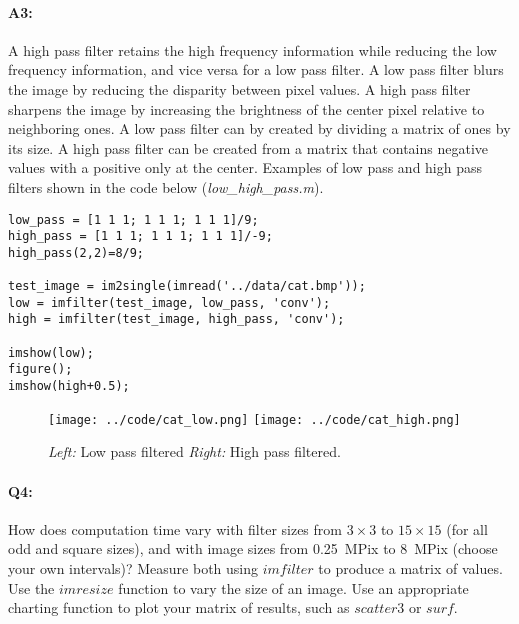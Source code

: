 	\paragraph{A3:} A high pass filter retains the high frequency information while reducing the low frequency information, and vice versa for a low pass filter. A low pass filter blurs the image by reducing the disparity between pixel values. A high pass filter sharpens the image by increasing the brightness of the center pixel relative to neighboring ones. A low pass filter can by created by dividing a matrix of ones by its size. A high pass filter can be created from a matrix that contains negative values with a positive only at the center. Examples of low pass and high pass filters shown in the code below (\emph{low\_high\_pass.m}).
	
		\begin{lstlisting}[style=Matlab-editor]
low_pass = [1 1 1; 1 1 1; 1 1 1]/9;
high_pass = [1 1 1; 1 1 1; 1 1 1]/-9;
high_pass(2,2)=8/9;

test_image = im2single(imread('../data/cat.bmp'));
low = imfilter(test_image, low_pass, 'conv');
high = imfilter(test_image, high_pass, 'conv');

imshow(low);
figure();
imshow(high+0.5);
	\end{lstlisting}
	\begin{figure}[h!]
		\centering
		\texttt{[image: ../code/cat\_low.png]}
		\texttt{[image: ../code/cat\_high.png]}
		\caption{\emph{Left:} Low pass filtered \emph{Right:} High pass filtered.}
		\label{fig:result2}
	\end{figure}
	
	
	
	\pagebreak
	\paragraph{Q4:} How does computation time vary with filter sizes from $3\times3$ to $15\times15$ (for all odd and square sizes), and with image sizes from 0.25~MPix to 8~MPix (choose your own intervals)? Measure both using \href{https://www.mathworks.com/help/images/ref/imfilter.html}{$imfilter$} to produce a matrix of values. Use the \href{https://www.mathworks.com/help/images/ref/imresize.html}{$imresize$} function to vary the size of an image. Use an appropriate charting function to plot your matrix of results, such as \href{https://www.mathworks.com/help/matlab/ref/scatter3.html}{$scatter3$} or \href{https://www.mathworks.com/help/matlab/ref/surf.html}{$surf$}.
	
